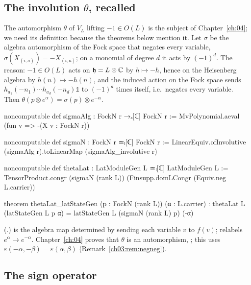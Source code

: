 \subsection{The involution \texorpdfstring{$\theta$}{theta}, recalled}

The automorphism $\theta$ of $V_L$ lifting $-1\in O(L)$ is the subject of Chapter~\ref{ch:04}; we
need its definition because the theorems below mention it. Let $\sigma$ be the algebra
automorphism of the Fock space that negates every variable, $\sigma(X_{(i,a)})=-X_{(i,a)}$; on a
monomial of degree $d$ it acts by $(-1)^d$. The reason: $-1\in O(L)$ acts on
$\mathfrak h=L\otimes{\mathbb{C}}$ by $h\mapsto-h$, hence on the Heisenberg algebra by $h(n)\mapsto-h(n)$,
and the induced action on the Fock space sends $h_{a_1}(-n_1)\cdots h_{a_d}(-n_d)\mathbb1$ to
$(-1)^d$ times itself, i.e.\ negates every variable. Then
$\theta(p\otimes e^\alpha)=\sigma(p)\otimes e^{-\alpha}$.
\begin{leancode}
noncomputable def sigmaAlg : FockN r →ₐ[ℂ] FockN r := MvPolynomial.aeval (fun v => -(X v : FockN r))

noncomputable def sigmaN : FockN r ≃ₗ[ℂ] FockN r :=
  LinearEquiv.ofInvolutive (sigmaAlg r).toLinearMap (sigmaAlg_involutive r)

noncomputable def thetaLat : LatModuleGen L ≃ₗ[ℂ] LatModuleGen L :=
  TensorProduct.congr (sigmaN (rank L)) (Finsupp.domLCongr (Equiv.neg L.carrier))

theorem thetaLat_latStateGen (p : FockN (rank L)) (α : L.carrier) :
    thetaLat L (latStateGen L p α) = latStateGen L (sigmaN (rank L) p) (-α)
\end{leancode}
(.)  is the algebra map determined
by sending each variable $v$ to $f(v)$;  relabels
$e^\alpha\mapsto e^{-\alpha}$. Chapter~\ref{ch:04} proves that $\theta$ is an automorphism,
; this uses $\varepsilon(-\alpha,-\beta)=
\varepsilon(\alpha,\beta)$ (Remark~\ref{ch03:rem:negneg}).

\subsection{The sign operator}

